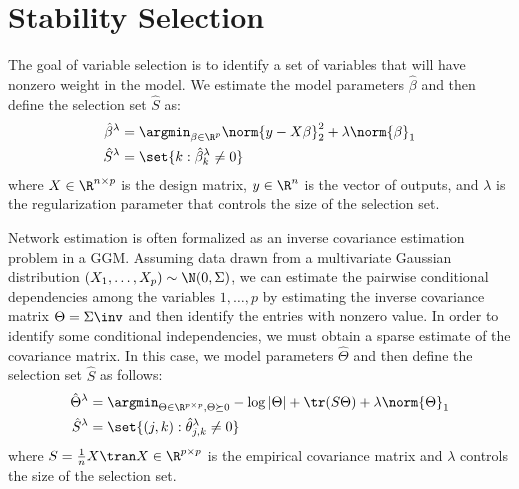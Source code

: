 \chapter{Stability Selection}
\label{app:M}
The goal of variable selection is to identify a set of variables that will have nonzero weight in the model. We estimate the model parameters $\hat{\beta}$ and then define the selection set $\hat{S}$ as:
\begin{equation}
    \begin{split}
        \hat{\beta}^{\lambda} &= \argmin_{\beta\in\R^p} \norm{y - X\beta}_2^2 + \lambda\norm{\beta}_1 \\
        \hat{S}^{\lambda} &= \set{k:\hat{\beta}_k^{\lambda} \neq 0}
    \end{split}
\end{equation}
where $X \in \R^{n\times p}$ is the design matrix, $y \in \R^n$ is the vector of outputs, and $\lambda$ is the regularization parameter that controls the size of the selection set.

Network estimation is often formalized as an inverse covariance estimation problem in a GGM. Assuming data drawn from a multivariate Gaussian distribution $(X_1,\ldots,X_p)\sim\N(0,\Sigma)$, we can estimate the pairwise conditional dependencies among the variables $1,\ldots,p$ by estimating the inverse covariance matrix $\Theta = \Sigma\inv$ and then identify the entries with nonzero value. In order to identify some conditional independencies, we must obtain a sparse estimate of the covariance matrix. In this case, we model parameters $\hat{\Theta}$ and then define the selection set $\hat{S}$ as follows:
\begin{equation}
    \begin{split}
        \hat{\Theta}^{\lambda} &= \argmin_{\Theta\in\R^{p\times p},\Theta\succeq 0} -\log|\Theta| + \tr(S\Theta) + \lambda\norm{\Theta}_1 \\
        \hat{S}^{\lambda} &= \set{(j,k):\hat{\theta}_{j,k}^{\lambda} \neq 0}
    \end{split}
\end{equation}
where $S = \frac{1}{n}X\tran X \in \R^{p\times p}$ is the empirical covariance matrix and $\lambda$ controls the size of the selection set.

